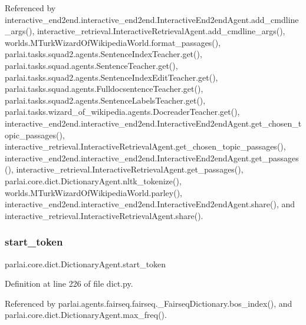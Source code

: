 Referenced by interactive\+\_\+end2end.\+interactive\+\_\+end2end.\+Interactive\+End2end\+Agent.\+add\+\_\+cmdline\+\_\+args(), interactive\+\_\+retrieval.\+Interactive\+Retrieval\+Agent.\+add\+\_\+cmdline\+\_\+args(), worlds.\+M\+Turk\+Wizard\+Of\+Wikipedia\+World.\+format\+\_\+passages(), parlai.\+tasks.\+squad2.\+agents.\+Sentence\+Index\+Teacher.\+get(), parlai.\+tasks.\+squad.\+agents.\+Sentence\+Teacher.\+get(), parlai.\+tasks.\+squad2.\+agents.\+Sentence\+Index\+Edit\+Teacher.\+get(), parlai.\+tasks.\+squad.\+agents.\+Fulldocsentence\+Teacher.\+get(), parlai.\+tasks.\+squad2.\+agents.\+Sentence\+Labels\+Teacher.\+get(), parlai.\+tasks.\+wizard\+\_\+of\+\_\+wikipedia.\+agents.\+Docreader\+Teacher.\+get(), interactive\+\_\+end2end.\+interactive\+\_\+end2end.\+Interactive\+End2end\+Agent.\+get\+\_\+chosen\+\_\+topic\+\_\+passages(), interactive\+\_\+retrieval.\+Interactive\+Retrieval\+Agent.\+get\+\_\+chosen\+\_\+topic\+\_\+passages(), interactive\+\_\+end2end.\+interactive\+\_\+end2end.\+Interactive\+End2end\+Agent.\+get\+\_\+passages(), interactive\+\_\+retrieval.\+Interactive\+Retrieval\+Agent.\+get\+\_\+passages(), parlai.\+core.\+dict.\+Dictionary\+Agent.\+nltk\+\_\+tokenize(), worlds.\+M\+Turk\+Wizard\+Of\+Wikipedia\+World.\+parley(), interactive\+\_\+end2end.\+interactive\+\_\+end2end.\+Interactive\+End2end\+Agent.\+share(), and interactive\+\_\+retrieval.\+Interactive\+Retrieval\+Agent.\+share().

\mbox{\label{classparlai_1_1core_1_1dict_1_1DictionaryAgent_a5ef1b542b4efa5228e957c1e167195bd}} 
\subsubsection{\texorpdfstring{start\+\_\+token}{start\_token}}
{\footnotesize\ttfamily parlai.\+core.\+dict.\+Dictionary\+Agent.\+start\+\_\+token}



Definition at line 226 of file dict.\+py.



Referenced by parlai.\+agents.\+fairseq.\+fairseq.\+\_\+\+Fairseq\+Dictionary.\+bos\+\_\+index(), and parlai.\+core.\+dict.\+Dictionary\+Agent.\+max\+\_\+freq().

